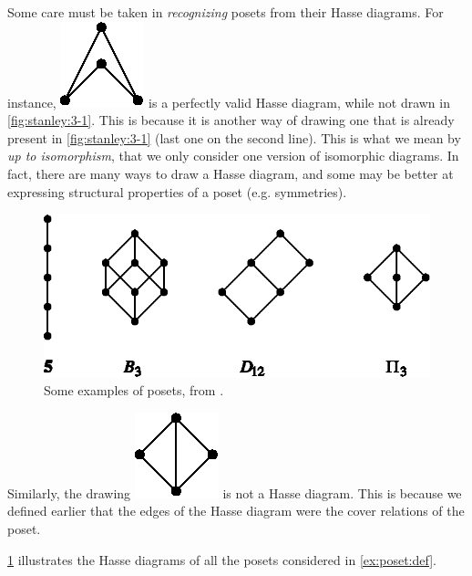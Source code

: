 Some care must be taken in \emph{recognizing} posets from their Hasse diagrams.
For instance, \includegraphics{fig/stanley/3-1:a} is a perfectly
valid Hasse diagram, while not drawn in \ref{fig:stanley:3-1}. This is because
it is another way of drawing one that is already present in
\ref{fig:stanley:3-1} (last one on the second line).
This is what we mean by \emph{up to isomorphism}, \ie that we only consider one
version of isomorphic diagrams. In fact, there are many ways to draw a Hasse
diagram, and some may be better at expressing structural properties of a poset
(e.g. symmetries).


\begin{figure}
	\centering
	\includegraphics[height=0.2\textheight]{fig/stanley/3-2}
	\caption{\label{fig:stanley:3-2} Some examples of posets, from
\citet*{Stanley:2011:ECV:2124415}.}
\end{figure}


Similarly, the drawing \includegraphics{fig/stanley/3-1:b} is not a Hasse diagram.
This is because we defined earlier that the edges of
the Hasse diagram were the cover relations of the poset.


\ref{fig:stanley:3-2} illustrates the Hasse diagrams of all the posets
considered in \ref{ex:poset:def}.

